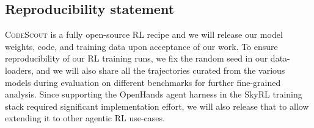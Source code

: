\documentclass{article} %
\newcommand{\methodname}{\textsc{CodeScout}\xspace}
\begin{document}
\subsection*{Reproducibility statement}
\methodname is a fully open-source RL recipe and we will release our model weights, code, and training data  upon acceptance of our work. To ensure reproducibility of our RL training runs, we fix the random seed in our data-loaders, and we will also share all the trajectories curated from the various models during evaluation on different benchmarks for further fine-grained analysis. Since supporting the OpenHands agent harness in the SkyRL training stack required significant implementation effort, we will also release that to allow extending it to other agentic RL use-cases.








\appendix

\end{document}
